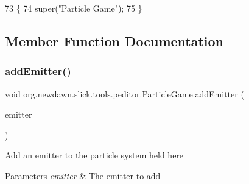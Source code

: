 \begin{DoxyCode}
73                                                                      \{
74         super(\textcolor{stringliteral}{"Particle Game"});
75     \}
\end{DoxyCode}


\subsection{Member Function Documentation}
\mbox{\label{classorg_1_1newdawn_1_1slick_1_1tools_1_1peditor_1_1_particle_game_ad0dcd4c71df78c3bbdc5cf2a8bcca2e0}} 
\subsubsection{\texorpdfstring{add\+Emitter()}{addEmitter()}}
{\footnotesize\ttfamily void org.\+newdawn.\+slick.\+tools.\+peditor.\+Particle\+Game.\+add\+Emitter (\begin{DoxyParamCaption}\item[{\mbox{\hyperlink{classorg_1_1newdawn_1_1slick_1_1particles_1_1_configurable_emitter}{Configurable\+Emitter}}}]{emitter }\end{DoxyParamCaption})\hspace{0.3cm}{\ttfamily [inline]}}

Add an emitter to the particle system held here


\begin{DoxyParams}{Parameters}
{\em emitter} & The emitter to add \\
\hline
\end{DoxyParams}


